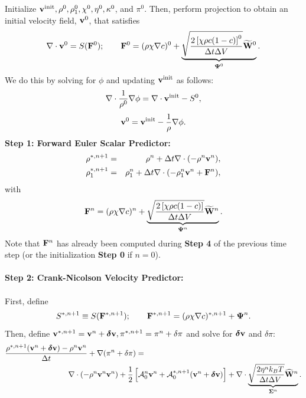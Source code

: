 \documentclass[final]{siamltex}
\def\Fb {{\bf F}}
\def\vb {{\bf v}}
\def\Wb {{\bf W}}
\def\deltab {\boldsymbol{\delta}}
\def\Psib   {\boldsymbol{\Psi}}
\def\Sigmab {\boldsymbol{\Sigma}}
\def\half   {\frac{1}{2}}
\begin{document}
Initialize $\vb^{\rm init}, \rho^0, \rho_1^0, \chi^0, \eta^0, \kappa^0$, and $\pi^0$.
Then, perform projection to obtain an initial velocity field, $\vb^0$, that satisfies
\begin{equation}
\nabla\cdot\vb^0 = S(\Fb^0); \qquad 
\Fb^0 = (\rho\chi\nabla c)^0 + \underbrace{\sqrt{\frac{2\left[\chi\rho c(1-c)\right]^0}{\Delta t\Delta V}}\widetilde\Wb^0}_{\Psib^0}.
\end{equation}
We do this by solving for $\phi$ and updating $\vb^{\rm init}$ as follows:
\begin{equation}
\nabla\cdot\frac{1}{\rho^0}\nabla\phi = \nabla\cdot\vb^{\rm init} - S^0,
\end{equation}
\begin{equation}
\vb^0 = \vb^{\rm init} - \frac{1}{\rho}\nabla\phi.
\end{equation}
{\bf Step 1: Forward Euler Scalar Predictor:}
\begin{eqnarray}
\rho^{*,n+1} &=& \rho^n + \Delta t\nabla\cdot(-\rho^n\vb^n),\\
\rho_1^{*,n+1} &=& \rho_1^n + \Delta t\nabla\cdot(-\rho_1^n\vb^n + \Fb^n),
\end{eqnarray}
with
\begin{equation}
\Fb^n = (\rho\chi\nabla c)^n + \underbrace{\sqrt{\frac{2\left[\chi\rho c(1-c)\right]}{\Delta t\Delta V}}\widetilde\Wb^n}_{\Psib^n}.
\end{equation}
Note that $\Fb^n$ has already been computed during {\bf Step 4} of the previous time step
(or the initialization {\bf Step 0} if $n=0$).\\ \\
{\bf Step 2: Crank-Nicolson Velocity Predictor:}\\ \\
First, define
\begin{equation}
S^{*,n+1} \equiv S(\Fb^{*,n+1});
\qquad
\Fb^{*,n+1} = (\rho\chi\nabla c)^{*,n+1} + \Psib^n.
\end{equation}
Then, define $\vb^{*,n+1} = \vb^n + \deltab\vb, \pi^{*,n+1} = \pi^n + \delta\pi$ and solve
for $\deltab\vb$ and $\delta\pi$:
\begin{eqnarray}
\frac{\rho^{*,n+1}(\vb^n + \deltab\vb) - \rho^n\vb^n}{\Delta t} + \nabla(\pi^n+\delta\pi) &=&\nonumber\\
&&\hspace{-1.5in}\nabla\cdot(-\rho^n\vb^n\vb^n) + \half\left[\mathcal{A}_0^n\vb^n + \mathcal{A}_0^{*,n+1}(\vb^n + \deltab\vb)\right] + \nabla\cdot\underbrace{\sqrt{\frac{2\eta^n k_B T}{\Delta t\Delta V}}\widehat\Wb^n}_{\Sigmab^n}.
\end{eqnarray}
\end{document}
